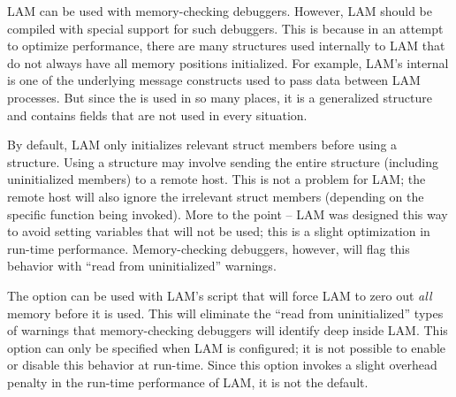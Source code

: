 LAM can be used with memory-checking debuggers.  However, LAM should
be compiled with special support for such debuggers.  This is because
in an attempt to optimize performance, there are many structures used
internally to LAM that do not always have all memory positions
initialized.  For example, LAM's internal  is one of
the underlying message constructs used to pass data between LAM
processes.  But since the  is used in so many
places, it is a generalized structure and contains fields that are not
used in every situation.

By default, LAM only initializes relevant struct members before using
a structure.  Using a structure may involve sending the entire
structure (including uninitialized members) to a remote host.  This is
not a problem for LAM; the remote host will also ignore the irrelevant
struct members (depending on the specific function being invoked).
More to the point -- LAM was designed this way to avoid setting
variables that will not be used; this is a slight optimization in
run-time performance.  Memory-checking debuggers, however, will flag
this behavior with ``read from uninitialized'' warnings.

The  option can be used with LAM's
 script that will force LAM to zero out {\em all}
memory before it is used.  This will eliminate the ``read from
uninitialized'' types of warnings that memory-checking debuggers will
identify deep inside LAM.  This option can only be specified when LAM
is configured; it is not possible to enable or disable this behavior
at run-time.  Since this option invokes a slight overhead penalty in
the run-time performance of LAM, it is not the default.


